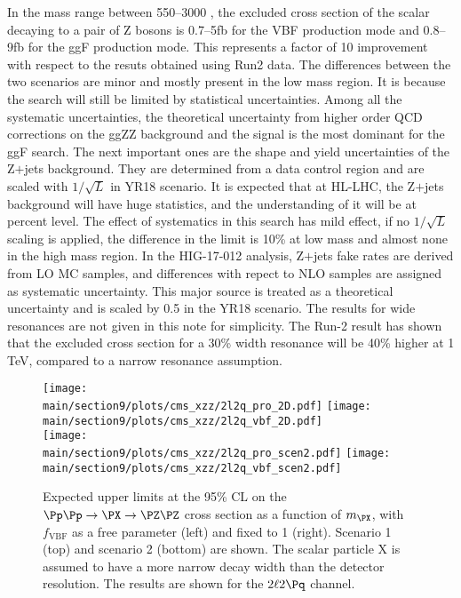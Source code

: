 In the mass range between 550--3000 \UGeV, the excluded cross section of the scalar decaying to a pair of Z bosons is 0.7--5\unit{fb} for the VBF production mode and 0.8--9\unit{fb} for the ggF production mode. This represents a factor of 10 improvement with respect to the resuts obtained using Run2 data. The differences between the two scenarios are minor and mostly present in the low mass region. It is because the search will still be limited by statistical uncertainties. Among all the systematic uncertainties, the theoretical uncertainty from higher order QCD corrections on the ggZZ background and the signal is the most dominant for the ggF search. The next important ones are the shape and yield uncertainties of the Z$+$jets background. They are determined from a data control region and are scaled with $1/\sqrt{L}$ in YR18 scenario. It is expected that at HL-LHC, the Z$+$jets background will have huge statistics, and the understanding of it will be at percent level. The effect of systematics in this search has mild effect, if no $1/\sqrt{L}$ scaling is applied, the difference in the limit is 10\% at low mass and almost none in the high mass region. In the HIG-17-012 analysis, Z$+$jets fake rates are derived from LO MC samples, and differences with repect to NLO samples are assigned as systematic uncertainty. This major source is treated as a theoretical uncertainty and is scaled by 0.5 in the YR18 scenario. 
The results for wide resonances are not given in this note for simplicity. The Run-2 result has shown that the excluded cross section for a 30\% width resonance will be 40\% higher at 1 TeV, compared to a narrow resonance assumption. 

\begin{figure}[htbp]
        \centering
        \texttt{[image: \\main/section9/plots/cms\_xzz/2l2q\_pro\_2D.pdf]}
        \texttt{[image: \\main/section9/plots/cms\_xzz/2l2q\_vbf\_2D.pdf]}\\
        \texttt{[image: \\main/section9/plots/cms\_xzz/2l2q\_pro\_scen2.pdf]}
        \texttt{[image: \\main/section9/plots/cms\_xzz/2l2q\_vbf\_scen2.pdf]}
        \caption{
                Expected upper limits at the 95\% CL on the $\Pp\Pp\to\PX\to\PZ\PZ$ cross section as a function of $m_\PX$, with $f_{\mathrm{VBF}}$ as a free parameter (left) and fixed to 1 (right). Scenario 1 (top) and scenario 2 (bottom) are shown. The scalar particle X is assumed to have a more narrow decay width than the detector resolution. The results are shown for the $2\ell2\Pq$ channel. 
                        \label{fig:combinedresult}
                }
\end{figure}